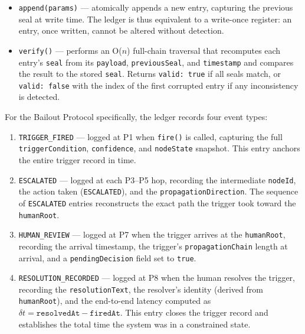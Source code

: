 \begin{itemize}
  \item \texttt{append(params)} — atomically appends a new entry, capturing the
        previous seal at write time.  The ledger is thus equivalent to a
        write-once register: an entry, once written, cannot be altered without
        detection.
  \item \texttt{verify()} — performs an O($n$) full-chain traversal that recomputes
        each entry's \texttt{seal} from its \texttt{payload}, \texttt{previousSeal},
        and \texttt{timestamp} and compares the result to the stored \texttt{seal}.
        Returns \texttt{valid: true} if all seals match, or \texttt{valid: false}
        with the index of the first corrupted entry if any inconsistency is detected.
\end{itemize}

For the Bailout Protocol specifically, the ledger records four event types:

\begin{enumerate}
  \item \texttt{TRIGGER\_FIRED} — logged at P1 when \texttt{fire()} is called,
        capturing the full \texttt{triggerCondition}, \texttt{confidence}, and
        \texttt{nodeState} snapshot.  This entry anchors the entire trigger record
        in time.

  \item \texttt{ESCALATED} — logged at each P3--P5 hop, recording the intermediate
        \texttt{nodeId}, the action taken (\texttt{ESCALATED}), and the
        \texttt{propagationDirection}.  The sequence of \texttt{ESCALATED} entries
        reconstructs the exact path the trigger took toward the \texttt{humanRoot}.

  \item \texttt{HUMAN\_REVIEW} — logged at P7 when the trigger arrives at the
        \texttt{humanRoot}, recording the arrival timestamp, the trigger's
        \texttt{propagationChain} length at arrival, and a \texttt{pendingDecision}
        field set to \texttt{true}.

  \item \texttt{RESOLUTION\_RECORDED} — logged at P8 when the human resolves the
        trigger, recording the \texttt{resolutionText}, the resolver's identity
        (derived from \texttt{humanRoot}), and the end-to-end latency computed as
        $\delta t = \texttt{resolvedAt} - \texttt{firedAt}$.  This entry closes the
        trigger record and establishes the total time the system was in a
        constrained state.
\end{enumerate}

